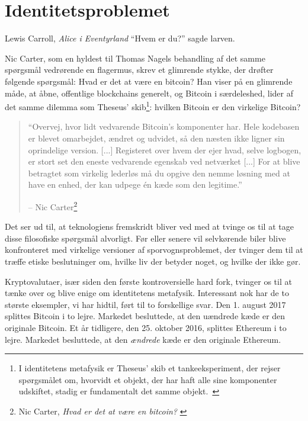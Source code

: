 \chapter{Identitetsproblemet}
\label{les:4}

\begin{chapquote}{Lewis Carroll, \textit{Alice i Eventyrland}}
\enquote{Hvem er du?} sagde larven.
\end{chapquote}

Nic Carter, som en hyldest til Thomas Nagels behandling af det samme spørgsmål 
vedrørende en flagermus, skrev et glimrende stykke, der drøfter følgende 
spørgsmål: Hvad er det at være en bitcoin? Han viser på en glimrende måde, at 
åbne, offentlige blockchains generelt, og Bitcoin i særdeleshed, lider af det 
samme dilemma som Theseus' skib\footnote{I identitetens metafysik er Theseus' 
skib et tankeeksperiment, der rejser spørgsmålet om, hvorvidt et objekt, der 
har haft alle sine komponenter udskiftet, stadig er fundamentalt det samme 
objekt.~\cite{wiki:theseus}}: hvilken Bitcoin er den virkelige Bitcoin?

\begin{quotation}\begin{samepage}
\enquote{Overvej, hvor lidt vedvarende Bitcoin's komponenter har. Hele 
kodebasen er blevet omarbejdet, ændret og udvidet, så den næsten ikke ligner 
sin oprindelige version. [...] Registeret over hvem der ejer hvad, selve 
logbogen, er stort set den eneste vedvarende egenskab ved netværket [...]
For at blive betragtet som virkelig lederløs må du opgive den nemme løsning med 
at have en enhed, der kan udpege én kæde som den legitime.}
\begin{flushright} -- Nic Carter\footnote{Nic Carter, \textit{Hvad er det at 
    være en bitcoin?} \cite{bitcoin-identity}}
\end{flushright}\end{samepage}\end{quotation}

Det ser ud til, at teknologiens fremskridt bliver ved med at tvinge os til at 
tage disse filosofiske spørgsmål alvorligt. Før eller senere vil selvkørende 
biler blive konfronteret med virkelige versioner af sporvognsproblemet, der 
tvinger dem til at træffe etiske beslutninger om, hvilke liv der betyder noget, 
og hvilke der ikke gør.

Kryptovalutaer, især siden den første kontroversielle hard fork, tvinger os til 
at tænke over og blive enige om identitetens metafysik. Interessant nok har de 
to største eksempler, vi har hidtil, ført til to forskellige svar. Den 1. 
august 2017 splittes Bitcoin i to lejre. Markedet besluttede, at den uændrede 
kæde er den originale Bitcoin. Et år tidligere, den 25. oktober 2016, splittes 
Ethereum i to lejre. Markedet besluttede, at den \textit{ændrede} kæde er den 
originale Ethereum.

